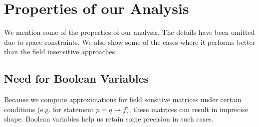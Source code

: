 \documentclass{sig-alternate}
\newcommand{\hide}[1]{} %
\newcommand{\p}{\ensuremath{p}}
\newcommand{\q}{\ensuremath{q}}
\begin{document}
\section{Properties of our Analysis}\label{sec:props}
We mention some of the properties of our analysis. The
details have been omitted due to space constraints.\hide{,
  and can be found in Sandeep's
  thesis~\cite{Sandeep11thesis}.} We also show some of the
cases where it performs better than the field insensitive
approaches.
\subsection{Need for Boolean Variables}
Because we compute approximations for field sensitive
matrices under certain conditions (e.g. for statement $\p =
\q\rightarrow f$), these matrices can result in imprecise
shape. Boolean variables help us retain some precision in
such cases.
\end{document}
